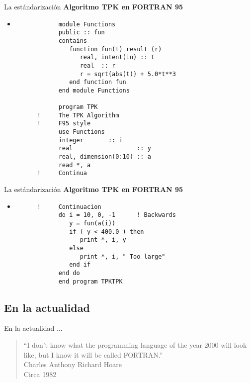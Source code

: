 \begin{frame}[fragile]{La estándarización}
    \textbf{Algoritmo TPK en FORTRAN 95}
    \begin{itemize}
    \item []
     \begin{verbatim}
            module Functions
            public :: fun
            contains
               function fun(t) result (r)
                  real, intent(in) :: t
                  real  :: r
                  r = sqrt(abs(t)) + 5.0*t**3
               end function fun
            end module Functions

            program TPK
      !     The TPK Algorithm
      !     F95 style
            use Functions
            integer       :: i
            real                  :: y
            real, dimension(0:10) :: a
            read *, a
      !     Continua
     \end{verbatim}
    \end{itemize}
\end{frame}

\begin{frame}[fragile]{La estándarización}
    \textbf{Algoritmo TPK en FORTRAN 95}
    \begin{itemize}
    \item []
     \begin{verbatim}
      !     Continuacion
            do i = 10, 0, -1      ! Backwards
               y = fun(a(i))
               if ( y < 400.0 ) then
                  print *, i, y
               else
                  print *, i, " Too large"
               end if
            end do
            end program TPKTPK
     \end{verbatim}
    \end{itemize}
\end{frame}

\subsection{En la actualidad}
\begin{frame}[fragile]{En la actualidad ...}
  \begin{quote}
    ``I don't know what the programming language of the year 2000 will look like, but I know it will be called FORTRAN.''\\
    Charles Anthony Richard Hoare\\
    Circa 1982
  \end{quote}
\end{frame}


